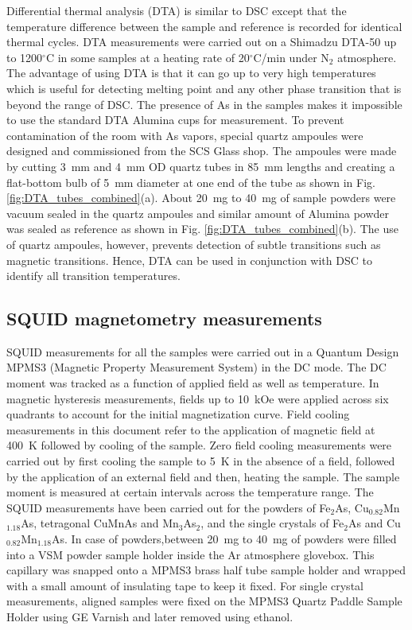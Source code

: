 \documentclass[letterpaper,10pt,doublespacing,edeposit]{uiucthesis2020}
\begin{document}
\begin{mainmatter}
Differential thermal analysis (DTA) is similar to DSC except that the temperature difference between the sample and reference is recorded for identical thermal cycles. DTA measurements were carried out on a Shimadzu DTA-50 up to 1200$^\circ$C in some samples at a heating rate of 20$^\circ$C/min under N$_2$ atmosphere. The advantage of using DTA is that it can go up to very high temperatures which is useful for detecting melting point and any other phase transition that is beyond the range of DSC. The presence of As in the samples makes it impossible to use the standard DTA Alumina cups for measurement. To prevent contamination of the room with As vapors, special quartz ampoules were designed and commissioned from the SCS Glass shop. The ampoules were made by cutting 3~mm and 4~mm OD quartz tubes in 85~mm lengths and creating a flat-bottom bulb of 5~mm diameter at one end of the tube as shown in Fig. \ref{fig:DTA_tubes_combined}(a). About 20~mg to 40~mg of sample powders were vacuum sealed in the quartz ampoules and similar amount of Alumina powder was sealed as reference as shown in Fig. \ref{fig:DTA_tubes_combined}(b). The use of quartz ampoules, however, prevents detection of subtle transitions such as magnetic transitions. Hence, DTA can be used in conjunction with DSC to identify all transition temperatures.

\subsection{SQUID magnetometry measurements}

SQUID measurements for all the samples were carried out in a Quantum Design MPMS3 (Magnetic Property Measurement System) in the DC mode. The DC moment was tracked as a function of applied field as well as temperature. In magnetic hysteresis measurements, fields up to 10~kOe were applied across six quadrants to account for the initial magnetization curve. Field cooling measurements in this document refer to the application of magnetic field at 400~K followed by cooling of the sample. Zero field cooling measurements were carried out by first cooling the sample to 5~K in the absence of a field, followed by the application of an external field and then, heating the sample. The sample moment is measured at certain intervals across the temperature range. The SQUID measurements have been carried out for the powders of Fe$_2$As, Cu$_{0.82}$Mn$_{1.18}$As, tetragonal CuMnAs and Mn$_3$As$_2$, and the single crystals of Fe$_2$As and Cu$_{0.82}$Mn$_{1.18}$As. In case of powders,between 20~mg to 40~mg of powders were filled into a VSM powder sample holder inside the Ar atmosphere glovebox. This capillary was snapped onto a MPMS3 brass half tube sample holder and wrapped with a small amount of insulating tape to keep it fixed. For single crystal measurements, aligned samples were fixed on the MPMS3 Quartz Paddle Sample Holder using GE Varnish and later removed using ethanol.



\end{mainmatter}
\end{document}
